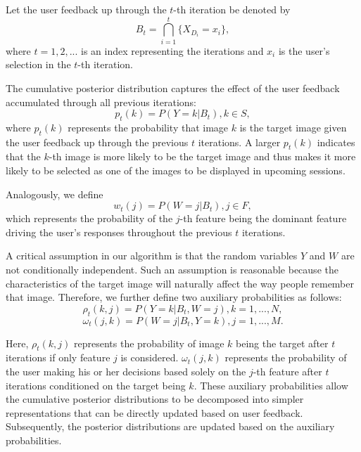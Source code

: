 \documentclass[journal]{IEEEtran}
\begin{document}
Let the user feedback up through the $t$-th iteration be denoted by
\begin{equation}
B_t=\bigcap_{i=1}^t\{X_{D_i}=x_i\},
\end{equation}
where $t=1,2,...$ is an index representing the iterations and $x_i$ is the user's selection in the $t$-th iteration.

The cumulative posterior distribution captures the effect of the user feedback accumulated through all previous iterations:
\begin{equation}
p_t(k)=P(Y=k|B_t),k\in S,
\end{equation}
where $p_t(k)$ represents the probability that image $k$ is the target image given the user feedback up through the previous $t$ iterations. A larger $p_t(k)$ indicates that the $k$-th image is more likely to be the target image and thus makes it more likely to be selected as one of the images to be displayed in upcoming sessions.

Analogously, we define
\begin{equation}
w_t(j)=P(W=j|B_t),j\in F,
\end{equation}
which represents the probability of the $j$-th feature being the dominant feature driving the user's responses throughout the previous $t$ iterations.

A critical assumption in our algorithm is that the random variables $Y$ and $W$ are not conditionally independent. Such an assumption is reasonable because the characteristics of the target image will naturally affect the way people remember that image. Therefore, we further define two auxiliary probabilities as follows:
\begin{equation}
\rho_t(k,j)=P(Y=k|B_t,W=j),k=1,...,N,
\end{equation}
\begin{equation}
\omega_t(j,k)=P(W=j|B_t,Y=k),j=1,...,M.
\end{equation}

Here, $\rho_t(k,j)$ represents the probability of image $k$ being the target after $t$ iterations if only feature $j$ is considered. $\omega_t(j,k)$ represents the probability of the user making his or her decisions based solely on the $j$-th feature after $t$ iterations conditioned on the target being $k$.
These auxiliary probabilities allow the cumulative posterior distributions to be decomposed into simpler representations that can be directly updated based on user feedback. Subsequently, the posterior distributions are updated based on the auxiliary probabilities.
\end{document}
